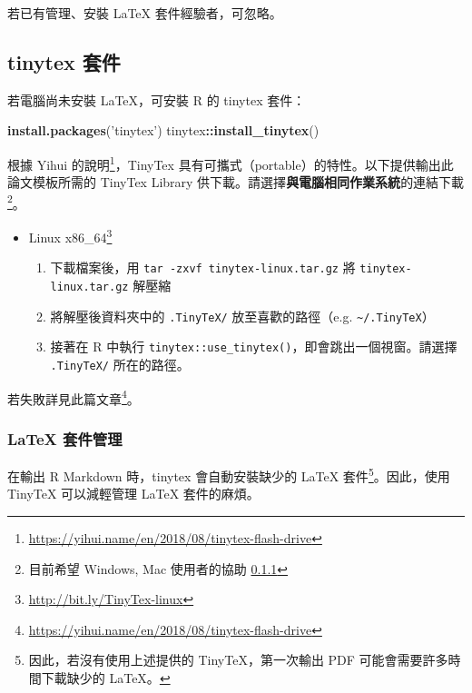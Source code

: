 \documentclass[oneside]{book}
\newenvironment{Shaded}{\begin{snugshade}}{\end{snugshade}}
\newcommand{\KeywordTok}[1]{\textcolor[rgb]{0.13,0.29,0.53}{\textbf{#1}}}
\newcommand{\StringTok}[1]{\textcolor[rgb]{0.31,0.60,0.02}{#1}}
\newcommand{\OperatorTok}[1]{\textcolor[rgb]{0.81,0.36,0.00}{\textbf{#1}}}
\newcommand{\NormalTok}[1]{#1}
\renewcommand{\href}[2]{#2\footnote{\url{#1}}}
\providecommand{\tightlist}{%
  \setlength{\itemsep}{0pt}\setlength{\parskip}{0pt}}
\theoremstyle{definition}
\theoremstyle{definition}
\theoremstyle{definition}
\theoremstyle{remark}
\begin{document}
若已有管理、安裝 LaTeX 套件經驗者，可忽略。

\subsection{tinytex 套件}\label{tinytex-}

若電腦尚未安裝 LaTeX，可安裝 R 的 tinytex 套件：

\begin{Shaded}
\begin{Highlighting}[]
\KeywordTok{install.packages}\NormalTok{(}\StringTok{'tinytex'}\NormalTok{)}
\NormalTok{tinytex}\OperatorTok{::}\KeywordTok{install_tinytex}\NormalTok{()}
\end{Highlighting}
\end{Shaded}

根據 Yihui
的\href{https://yihui.name/en/2018/08/tinytex-flash-drive}{說明}，TinyTex
具有可攜式（portable）的特性。以下提供輸出此論文模板所需的 TinyTex
Library 供下載。請選擇\textbf{與電腦相同作業系統}的連結下載\footnote{目前希望
  Windows, Mac 使用者的協助 \ref{tinytex-manage}}。

\begin{itemize}
\tightlist
\item
  \href{http://bit.ly/TinyTex-linux}{Linux x86\_64}

  \begin{enumerate}
  \def\labelenumi{\alph{enumi})}
  \tightlist
  \item
    下載檔案後，用 \texttt{tar\ -zxvf\ tinytex-linux.tar.gz} 將
    \texttt{tinytex-linux.tar.gz} 解壓縮
  \item
    將解壓後資料夾中的 \texttt{.TinyTeX/} 放至喜歡的路徑（e.g.
    \texttt{\textasciitilde{}/.TinyTeX}）
  \item
    接著在 R 中執行
    \texttt{tinytex::use\_tinytex()}，即會跳出一個視窗。請選擇
    \texttt{.TinyTeX/} 所在的路徑。
  \end{enumerate}
\end{itemize}

若失敗詳見\href{https://yihui.name/en/2018/08/tinytex-flash-drive}{此篇文章}。

\subsubsection{LaTeX 套件管理}\label{tinytex-manage}

在輸出 R Markdown 時，tinytex 會自動安裝缺少的 LaTeX 套件\footnote{因此，若沒有使用上述提供的
  TinyTeX，第一次輸出 PDF 可能會需要許多時間下載缺少的 LaTeX。}。因此，使用
TinyTeX 可以減輕管理 LaTeX 套件的麻煩。
\end{document}
